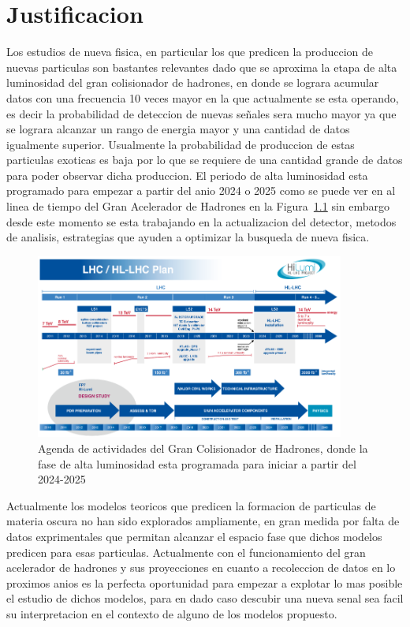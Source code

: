 \chapter{Justificacion}

Los estudios de nueva fisica, en particular los que predicen la produccion de nuevas particulas son bastantes relevantes dado que se aproxima la etapa de alta luminosidad del gran colisionador de hadrones, en donde se lograra acumular datos con una frecuencia 10 veces mayor en la que actualmente se esta operando, es decir la probabilidad de deteccion de nuevas se\~nales sera mucho mayor ya que se lograra alcanzar un rango de energia mayor y una cantidad de datos igualmente superior. Usualmente la probabilidad de produccion de estas particulas exoticas es baja por lo que se requiere de una cantidad grande de datos para poder observar dicha produccion. El periodo de alta luminosidad esta programado para empezar a partir del anio 2024 o 2025 como se puede ver en al linea de tiempo del Gran Acelerador de Hadrones en la Figura~\ref{fig:lhctimeline} sin embargo desde este momento se esta trabajando en la actualizacion del detector, metodos de analisis, estrategias que ayuden a optimizar la busqueda de nueva fisica. 

\begin{figure}
\begin{center}
  \includegraphics[width=4.0in]{lhc_timeline.png}
  \caption{Agenda de actividades del Gran Colisionador de Hadrones, donde la fase de alta luminosidad esta programada para iniciar a partir del 2024-2025}
  \label{fig:lhctimeline}
\end{center}
\end{figure}


Actualmente los modelos teoricos que predicen la formacion de particulas de materia oscura no han sido explorados ampliamente, en gran medida por falta de datos exprimentales que permitan alcanzar el espacio fase que dichos modelos predicen para esas particulas.  Actualmente con el funcionamiento del gran acelerador de hadrones y sus proyecciones en cuanto a recoleccion de datos en lo proximos anios es la perfecta oportunidad para empezar a explotar lo mas posible el estudio de dichos modelos, para en dado caso descubir una nueva senal sea facil su interpretacion en el contexto de alguno de los modelos propuesto.


